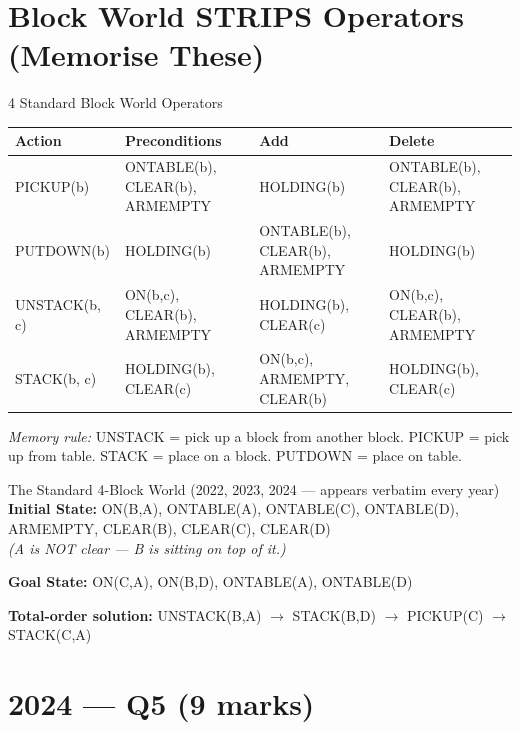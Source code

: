 \documentclass[12pt,a4paper]{article}
\begin{document}
\section*{Block World STRIPS Operators (Memorise These)}

\begin{algobox}{4 Standard Block World Operators}
\begin{tabular}{@{}p{3.8cm}p{5.5cm}p{2.5cm}p{2.5cm}@{}}
\toprule
\textbf{Action} & \textbf{Preconditions} & \textbf{Add} & \textbf{Delete} \\
\midrule
PICKUP(b) & ONTABLE(b), CLEAR(b), ARMEMPTY & HOLDING(b) & ONTABLE(b), CLEAR(b), ARMEMPTY \\
PUTDOWN(b) & HOLDING(b) & ONTABLE(b), CLEAR(b), ARMEMPTY & HOLDING(b) \\
UNSTACK(b, c) & ON(b,c), CLEAR(b), ARMEMPTY & HOLDING(b), CLEAR(c) & ON(b,c), CLEAR(b), ARMEMPTY \\
STACK(b, c) & HOLDING(b), CLEAR(c) & ON(b,c), ARMEMPTY, CLEAR(b) & HOLDING(b), CLEAR(c) \\
\bottomrule
\end{tabular}

\medskip
\textit{Memory rule:} UNSTACK = pick up a block from another block.
PICKUP = pick up from table. STACK = place on a block. PUTDOWN = place on table.
\end{algobox}

\begin{warnbox}{The Standard 4-Block World (2022, 2023, 2024 --- appears verbatim every year)}
\textbf{Initial State:}
ON(B,A), ONTABLE(A), ONTABLE(C), ONTABLE(D), ARMEMPTY, CLEAR(B), CLEAR(C), CLEAR(D)\\
\emph{(A is NOT clear --- B is sitting on top of it.)}

\medskip
\textbf{Goal State:} ON(C,A), ON(B,D), ONTABLE(A), ONTABLE(D)

\medskip
\textbf{Total-order solution:}
UNSTACK(B,A) $\rightarrow$ STACK(B,D) $\rightarrow$ PICKUP(C) $\rightarrow$ STACK(C,A)
\end{warnbox}

\newpage

\section{2024 --- Q5 (9 marks)}
\end{document}
